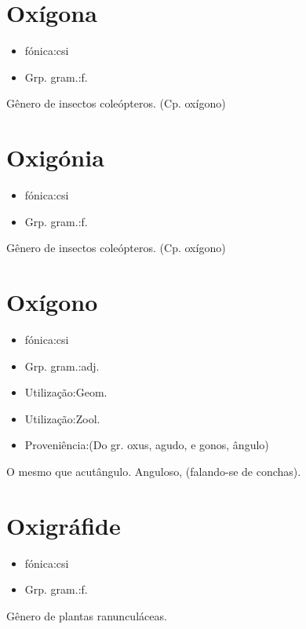 \section{Oxígona}
\begin{itemize}
\item {fónica:csi}
\end{itemize}
\begin{itemize}
\item {Grp. gram.:f.}
\end{itemize}
Gênero de insectos coleópteros.
(Cp. \textunderscore oxígono\textunderscore )
\section{Oxigónia}
\begin{itemize}
\item {fónica:csi}
\end{itemize}
\begin{itemize}
\item {Grp. gram.:f.}
\end{itemize}
Gênero de insectos coleópteros.
(Cp. \textunderscore oxígono\textunderscore )
\section{Oxígono}
\begin{itemize}
\item {fónica:csi}
\end{itemize}
\begin{itemize}
\item {Grp. gram.:adj.}
\end{itemize}
\begin{itemize}
\item {Utilização:Geom.}
\end{itemize}
\begin{itemize}
\item {Utilização:Zool.}
\end{itemize}
\begin{itemize}
\item {Proveniência:(Do gr. \textunderscore oxus\textunderscore , agudo, e \textunderscore gonos\textunderscore , ângulo)}
\end{itemize}
O mesmo que \textunderscore acutângulo\textunderscore .
Anguloso, (falando-se de conchas).
\section{Oxigráfide}
\begin{itemize}
\item {fónica:csi}
\end{itemize}
\begin{itemize}
\item {Grp. gram.:f.}
\end{itemize}
Gênero de plantas ranunculáceas.
